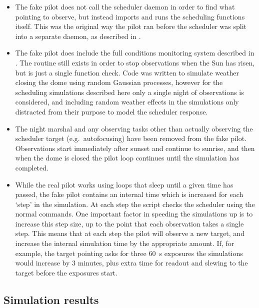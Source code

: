 \begin{colsection}
\begin{colsection}
\begin{itemize}
    \item The fake pilot does not call the scheduler daemon in order to find what pointing to observe, but instead imports and runs the scheduling functions itself. This was the original way the pilot ran before the scheduler was split into a separate daemon, as described in .
    \item The fake pilot does include the full conditions monitoring system described in . The  routine still exists in order to stop observations when the Sun has risen, but is just a single function check. Code was written to simulate weather closing the dome using random Gaussian processes, however for the scheduling simulations described here only a single night of observations is considered, and including random weather effects in the simulations only distracted from their purpose to model the scheduler response.
    \item The night marshal and any observing tasks other than actually observing the scheduler target (e.g.\ autofocusing) have been removed from the fake pilot. Observations start immediately after sunset and continue to sunrise, and then when the dome is closed the pilot loop continues until the simulation has completed.
    \item While the real pilot works using loops that sleep until a given time has passed, the fake pilot contains an internal time which is increased for each `step' in the simulation. At each step the script checks the scheduler using the normal commands. One important factor in speeding the simulations up is to increase this step size, up to the point that each observation takes a single step. This means that at each step the pilot will observe a new target, and increase the internal simulation time by the appropriate amount. If, for example, the target pointing asks for three \SI{60}{\second} exposures the simulations would increase by 3 minutes, plus extra time for readout and slewing to the target before the exposures start.
\end{itemize}

\end{colsection}

\subsection{Simulation results}
\label{sec:scheduler_sim_results}
\begin{colsection}


\end{colsection}
\end{colsection}
